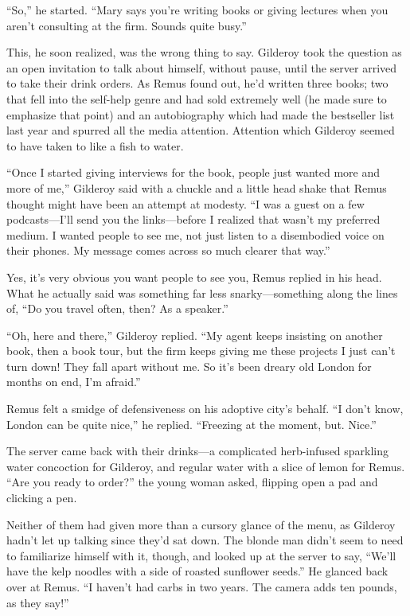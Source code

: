 “So,” he started. “Mary says you’re writing books or giving lectures when you aren’t consulting at the firm. Sounds quite busy.”

This, he soon realized, was the wrong thing to say. Gilderoy took the question as an open invitation to talk about himself, without pause, until the server arrived to take their drink orders. As Remus found out, he’d written three books; two that fell into the self-help genre and had sold extremely well (he made sure to emphasize that point) and an autobiography which had made the bestseller list last year and spurred all the media attention. Attention which Gilderoy seemed to have taken to like a fish to water.

“Once I started giving interviews for the book, people just wanted more and more of me,” Gilderoy said with a chuckle and a little head shake that Remus thought might have been an attempt at modesty. “I was a guest on a few podcasts—I’ll send you the links—before I realized that wasn’t my preferred medium. I wanted people to see me, not just listen to a disembodied voice on their phones. My message comes across so much clearer that way.”

Yes, it’s very obvious you want people to see you, Remus replied in his head. What he actually said was something far less snarky—something along the lines of, “Do you travel often, then? As a speaker.”

“Oh, here and there,” Gilderoy replied. “My agent keeps insisting on another book, then a book tour, but the firm keeps giving me these projects I just can’t turn down! They fall apart without me. So it’s been dreary old London for months on end, I’m afraid.”

Remus felt a smidge of defensiveness on his adoptive city’s behalf. “I don’t know, London can be quite nice,” he replied. “Freezing at the moment, but. Nice.”

The server came back with their drinks—a complicated herb-infused sparkling water concoction for Gilderoy, and regular water with a slice of lemon for Remus. “Are you ready to order?” the young woman asked, flipping open a pad and clicking a pen.

Neither of them had given more than a cursory glance of the menu, as Gilderoy hadn’t let up talking since they’d sat down. The blonde man didn’t seem to need to familiarize himself with it, though, and looked up at the server to say, “We’ll have the kelp noodles with a side of roasted sunflower seeds.” He glanced back over at Remus. “I haven’t had carbs in two years. The camera adds ten pounds, as they say!”

